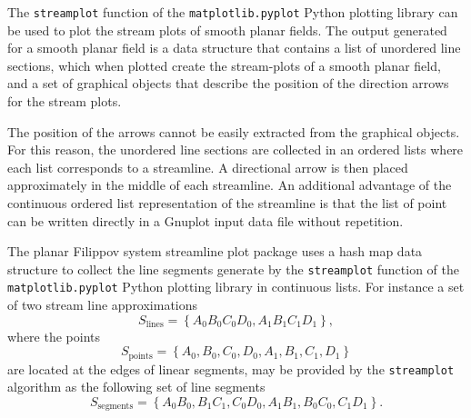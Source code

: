 \documentclass[english, a4paper]{article}
\begin{document}
The \texttt{streamplot} function of the \texttt{matplotlib.pyplot} Python plotting library can be used to plot the stream plots of smooth planar fields. The output generated for a smooth planar field is a data structure that contains a list of unordered line sections, which when plotted create the stream-plots of a smooth planar field, and a set of graphical objects that describe the position of the direction arrows for the stream plots.

The position of the arrows cannot be easily extracted from the graphical objects. For this reason, the unordered line sections are collected in an ordered lists where each list corresponds to a streamline. A directional arrow is then placed approximately in the middle of each streamline. An additional advantage of the continuous ordered list representation of the streamline is that the list of point can be written directly in a Gnuplot input data file without repetition.

The planar Filippov system streamline plot package uses a hash map data structure to collect the line segments generate by the \texttt{streamplot} function of the \texttt{matplotlib.pyplot} Python plotting library in continuous lists. For instance a set of two stream line approximations
\begin{equation}
	S_{\mathrm{lines}} = \left\{ A_{0}B_{0}C_{0}D_{0}, A_{1}B_{1}C_{1}D_{1} \right\},
\end{equation}
where the points
\begin{equation}
	S_{\mathrm{points}} = \left\{ A_{0}, B_{0}, C_{0}, D_{0}, A_{1}, B_{1}, C_{1}, D_{1} \right\}
\end{equation}
are located at the edges of linear segments, may be provided by the \texttt{streamplot} algorithm as the following set of line segments
\begin{equation}
	S_{\mathrm{segments}} = \left\{ A_{0}B_{0}, B_{1} C_{1}, C_{0}D_{0}, A_{1}B_{1}, B_{0}C_{0}, C_{1} D_{1} \right\}.
\end{equation}
\end{document}
